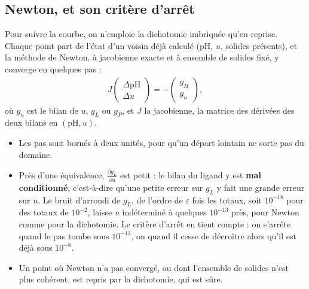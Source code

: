 \documentclass[a4paper,11pt]{article}
\newcommand\gras[1]{\textbf{#1}}
\newcommand\pH{\ensuremath{\mathrm{pH}}\xspace}
\newcommand\pdp[2]{\frac{\partial#1}{\partial#2}}
\newcommand\eps{\varepsilon}
\begin{document}
\subsection{Newton, et son critère d'arrêt}
\begin{algo}
Pour suivre la courbe, on n'emploie la dichotomie imbriquée qu'en reprise.
Chaque point part de l'état d'un voisin déjà calculé (\pH, $u$, solides présents), et la méthode de Newton, à jacobienne exacte et à ensemble de solides fixé, y converge en quelques pas :
\begin{align}
J\begin{pmatrix}\Delta\pH\\ \Delta u\end{pmatrix}=-\begin{pmatrix}g_H\\ g_u\end{pmatrix},
\end{align}
où $g_u$ est le bilan de $u$, $g_L$ ou $g_P$, et $J$ la jacobienne, la matrice des dérivées des deux bilans en $(\pH,u)$.
\begin{itemize}
\item Les pas sont bornés à deux unités, pour qu'un départ lointain ne sorte pas du domaine.
\item Près d'une équivalence, $\pdp{g_L}u$ est petit : le bilan du ligand y est \gras{mal conditionné}, c'est-à-dire qu'une petite erreur sur $g_L$ y fait une grande erreur sur $u$.
Le bruit d'arrondi de $g_L$, de l'ordre de $\eps$ fois les totaux, soit $10^{-18}$ pour des totaux de $10^{-2}$, laisse $u$ indéterminé à quelques $10^{-13}$ près, pour Newton comme pour la dichotomie.
Le critère d'arrêt en tient compte : on s'arrête quand le pas tombe sous $10^{-13}$, ou quand il cesse de décroître alors qu'il est déjà sous $10^{-8}$.
\item Un point où Newton n'a pas convergé, ou dont l'ensemble de solides n'est plus cohérent, est repris par la dichotomie, qui est sûre.
\end{itemize}
\end{algo}
\end{document}
